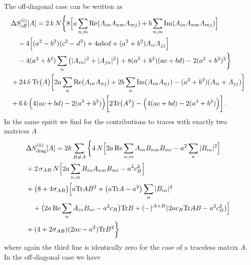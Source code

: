 \documentclass[10pt,a4paper]{article}
\newcommand{\RN}[1]{%
    \textup{\uppercase\expandafter{\romannumeral#1}}%
}
\newcommand{\Tr}{\mathrm{Tr}\vspace{-2pt}}
\begin{document}
The off-diagonal case can be written as
\begin{align}
  &\Delta S^{(\RN{1})}_{\mathrm{off}} [A] = 2 \, k  \, N
  \bigg\{
    8
    \Big[
      a \sum_{n,m} \operatorname{Re} (A_{in} A_{nm} A_{mj}) +
      b \sum_{n,m} \operatorname{Im} (A_{in} A_{nm} A_{mj})
    \Big]
    \nonumber \\
    &\quad-4
    \Big[
      (a^2-b^2)(c^2-d^2)
      + 4 a b c d
      + ( a^2 + b^2 ) A_{ii} A_{jj}
    \Big]
    \nonumber \\
    &\quad-4 (a^2+b^2) \sum_n \left( |A_{in}|^2 + |A_{jn}|^2 \right)
    + 8 (a^2+b^2)(ac+bd)
    - 2 (a^2+b^2)^2
  \bigg\}
  \nonumber \\
  &+24 \, k  \, \Tr \big( A \big)
  \bigg[
    2 a \sum_n \operatorname{Re} (A_{in} A_{nj})
    + 2 b \sum_n \operatorname{Im} (A_{in} A_{nj})
    - (a^2+b^2) (A_{ii}+A_{jj})
  \bigg]
  \nonumber \\
  &+6 \, k \,
  \Big( 4 ( ac + bd ) - 2 ( a^2 + b^2 ) \Big)
  \bigg[
    2 \Tr \big( A^2 \big)
    -
    \Big( 4 ( ac + bd ) - 2 ( a^2 + b^2 ) \Big)
  \bigg] \,.
\end{align}
In the same spirit we find for the contributions to traces with exactly two matrices $A$
\begin{align}
  &\Delta S^{(\RN{2})}_{\mathrm{diag}} [A] =
  2k \sum_{B \neq A}
  \bigg\{
    4 \, N
    \Big[
      2 a \operatorname{Re} \sum_{n,m} A_{in} B_{nm} B_{mi}
      - a^2 \sum_n |B_{in}|^2
    \Big]
  \nonumber \\
  &+2 \, \sigma_{AB} \, N
  \Big[
      2 a \sum_{n,m} B_{in} A_{nm} B_{mi}
      - a^2 c_B^2
  \Big]
  \nonumber \\
  &+ \big( 8+4\sigma_{AB} \big)
  \Big[
    a \Tr AB^2
    + \big( a \Tr A - a^2 \big) \sum_n |B_{in}|^2
    \nonumber \\
    &\quad+ \big( 2a \operatorname{Re} \sum_n A_{in} B_{ni} - a^2 c_B \big) \Tr B
    + (-)^{A+B} (2 a c_B \Tr AB - a^2 c_B^2)
  \Big]
  \nonumber \\
  &+ (4+2\sigma_{AB})(2ac-a^2) \Tr B^2
 \bigg\}
\end{align}
where again the third line is identically zero for the case of a
traceless matrix $A$. In the off-diagonal case we have
\end{document}
